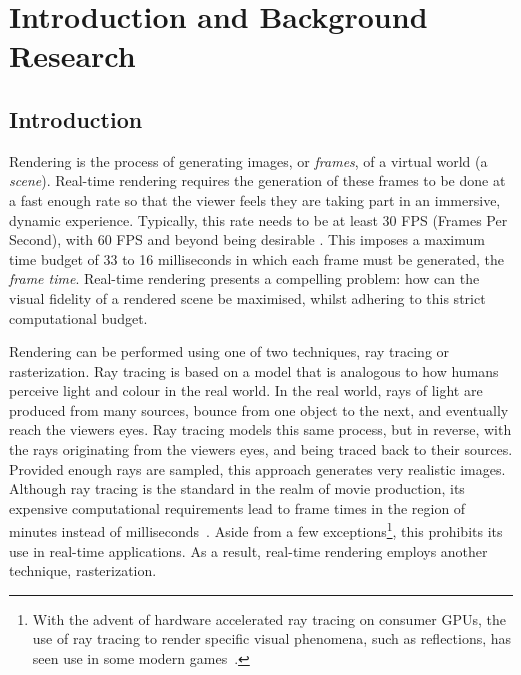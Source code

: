 \chapter{Introduction and Background Research}

\setlength{\parindent}{1em}
\setlength{\parskip}{0em}
\label{chapter1}
\justifying

\section{Introduction}

Rendering is the process of generating images, or \textit{frames}, of a virtual world (a \textit{scene}). Real-time rendering requires the generation of these frames to be done at a fast enough rate so that the viewer feels they are taking part in an immersive, dynamic experience. Typically, this rate needs to be at least 30 FPS (Frames Per Second), with 60 FPS and beyond being desirable \cite{EffectsOfFrameRate}. This imposes a maximum time budget of 33 to 16 milliseconds in which each frame must be generated, the \textit{frame time}. Real-time rendering presents a compelling problem: how can the visual fidelity of a rendered scene be maximised, whilst adhering to this strict computational budget.

Rendering can be performed using one of two techniques, ray tracing or rasterization. Ray tracing is based on a model that is analogous to how humans perceive light and colour in the real world. In the real world, rays of light are produced from many sources, bounce from one object to the next, and eventually reach the viewers eyes. Ray tracing models this same process, but in reverse, with the rays originating from the viewers eyes, and being traced back to their sources. Provided enough rays are sampled, this approach generates very realistic images. Although ray tracing is the standard in the realm of movie production, its expensive computational requirements lead to frame times in the region of minutes instead of milliseconds~\cite{PixarCars}. Aside from a few exceptions\footnote{With the advent of hardware accelerated ray tracing on consumer GPUs, the use of ray tracing to render specific visual phenomena, such as reflections, has seen use in some modern games~\cite{NvidiaTuringArchitecture, Battlefield5RayTracing}.}, this prohibits its use in real-time applications. As a result, real-time rendering employs another technique, rasterization.

